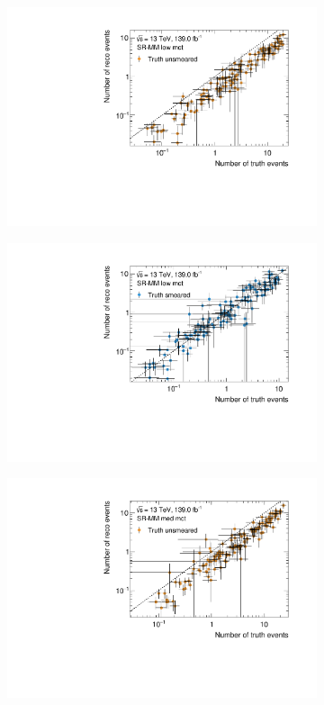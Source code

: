 \begin{figure}
	\centering
	\begin{subfigure}[b]{0.49\linewidth}
		\centering\includegraphics[width=\textwidth]{yields_SR-MM_low_mct_unsmeared}
	\end{subfigure}\hfill
	\begin{subfigure}[b]{0.49\linewidth}
		\centering\includegraphics[width=\textwidth]{yields_SR-MM_low_mct_smeared}
	\end{subfigure}\hfill
	\begin{subfigure}[b]{0.49\linewidth}
		\centering\includegraphics[width=\textwidth]{yields_SR-MM_med_mct_unsmeared}

\end{subfigure}
\end{figure}
